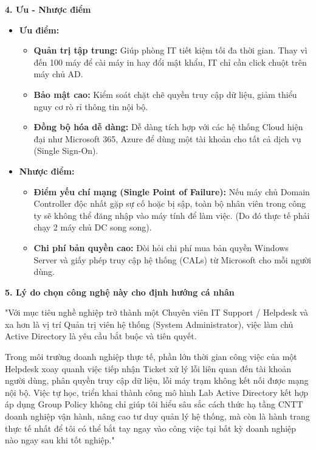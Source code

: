 \documentclass[
]{article}
\begin{document}
\textbf{4. Ưu - Nhược điểm}

\begin{itemize}
\item
  \textbf{Ưu điểm:}

  \begin{itemize}
  \item
    \textbf{Quản trị tập trung:} Giúp phòng IT tiết kiệm tối đa thời
    gian. Thay vì đến 100 máy để cài máy in hay đổi mật khẩu, IT chỉ cần
    click chuột trên máy chủ AD.
  \item
    \textbf{Bảo mật cao:} Kiểm soát chặt chẽ quyền truy cập dữ liệu,
    giảm thiểu nguy cơ rò rỉ thông tin nội bộ.
  \item
    \textbf{Đồng bộ hóa dễ dàng:} Dễ dàng tích hợp với các hệ thống
    Cloud hiện đại như Microsoft 365, Azure để dùng một tài khoản cho
    tất cả dịch vụ (Single Sign-On).
  \end{itemize}
\item
  \textbf{Nhược điểm:}

  \begin{itemize}
  \item
    \textbf{Điểm yếu chí mạng (Single Point of Failure):} Nếu máy chủ
    Domain Controller độc nhất gặp sự cố hoặc bị sập, toàn bộ nhân viên
    trong công ty sẽ không thể đăng nhập vào máy tính để làm việc. (Do
    đó thực tế phải chạy 2 máy chủ DC song song).
  \item
    \textbf{Chi phí bản quyền cao:} Đòi hỏi chi phí mua bản quyền
    Windows Server và giấy phép truy cập hệ thống (CALs) từ Microsoft
    cho mỗi người dùng.
  \end{itemize}
\end{itemize}

\textbf{5. Lý do chọn công nghệ này cho định hướng cá nhân}

"Với mục tiêu nghề nghiệp trở thành một Chuyên viên IT Support /
Helpdesk và xa hơn là vị trí Quản trị viên hệ thống (System
Administrator), việc làm chủ Active Directory là yêu cầu bắt buộc và
tiên quyết.

Trong môi trường doanh nghiệp thực tế, phần lớn thời gian công việc của
một Helpdesk xoay quanh việc tiếp nhận Ticket xử lý lỗi liên quan đến
tài khoản người dùng, phân quyền truy cập dữ liệu, lỗi máy trạm không
kết nối được mạng nội bộ. Việc tự học, triển khai thành công mô hình Lab
Active Directory kết hợp áp dụng Group Policy không chỉ giúp tôi hiểu
sâu sắc cách thức hạ tầng CNTT doanh nghiệp vận hành, nâng cao tư duy
quản lý hệ thống, mà còn là hành trang thực tế nhất để tôi có thể bắt
tay ngay vào công việc tại bất kỳ doanh nghiệp nào ngay sau khi tốt
nghiệp."
\end{document}
